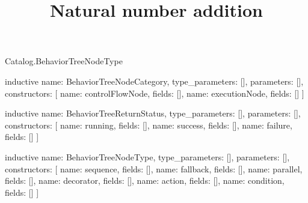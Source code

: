 \begin{lexlean}{Catalog.BehaviorTreeNodeType}
\title{Natural number addition}
\begin{semanticmodule}
inductive{
  name: BehaviorTreeNodeCategory,
  type_parameters: [],
  parameters: [],
  constructors: [
    {name: controlFlowNode, fields: []},
    {name: executionNode, fields: []}
  ]
}

inductive{
  name: BehaviorTreeReturnStatus,
  type_parameters: [],
  parameters: [],
  constructors: [
    {name: running, fields: []},
    {name: success, fields: []},
    {name: failure, fields: []}
  ]
}

inductive{
  name: BehaviorTreeNodeType,
  type_parameters: [],
  parameters: [],
  constructors: [
    {name: sequence, fields: []},
    {name: fallback, fields: []},
    {name: parallel, fields: []},
    {name: decorator, fields: []},
    {name: action, fields: []},
    {name: condition, fields: []}
  ]
}
\end{semanticmodule}
\end{lexlean}
